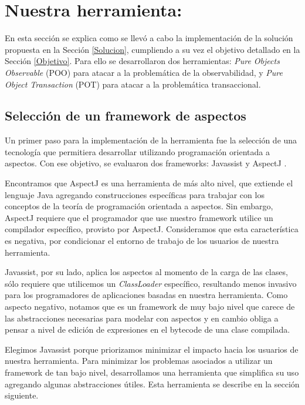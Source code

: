 \section{Nuestra herramienta: }

	En esta sección se explica como se llevó a cabo la implementación de la solución
	propuesta en la Sección \ref{Solucion}, cumpliendo a su vez el objetivo
	detallado en la Sección \ref{Objetivo}. Para ello se desarrollaron dos
	herramientas:
	\emph{Pure Objects Observable} (POO) para atacar a la problemática de la
	observabilidad, y \emph{Pure Object Transaction} (POT) para atacar a la
	problemática transaccional.
		
	\subsection{Selección de un framework de aspectos}  
		Un primer paso para la implementación de la herramienta fue la selección de una
		tecnología que permitiera desarrollar utilizando programación orientada a
		aspectos.
		Con ese objetivo, se evaluaron dos frameworks: Javassist
		\cite{chiba00loadtime} y AspectJ \cite{KiczalesHHKPG01}.
		
		\medskip 
		Encontramos que AspectJ es una herramienta de más alto nivel, que extiende
		el lenguaje Java agregando construcciones específicas para trabajar con
		los conceptos de la teoría de programación orientada a aspectos.
		Sin embargo, AspectJ requiere que el programador que use nuestro framework
		utilice un compilador específico, provisto por AspectJ. 
		Consideramos que esta característica es negativa, por condicionar el
		entorno de trabajo de los usuarios de nuestra herramienta.
		
		Javassist, por su lado, aplica los aspectos al momento de
		la carga de las clases, sólo requiere que utilicemos un \emph{ClassLoader}
		específico, resultando menos invasivo para los programadores de aplicaciones
		basadas en nuestra herramienta.
		Como aspecto negativo, notamos que es un framework de muy bajo nivel que
		carece de las abstracciones necesarias para modelar con aspectos y en cambio
		obliga a pensar a nivel de edición de expresiones en el bytecode de una clase
		compilada.
		
		Elegimos Javassist porque priorizamos minimizar el impacto hacia los usuarios
		de nuestra herramienta.
		Para minimizar los problemas asociados a utilizar un framework de tan bajo
		nivel, desarrollamos una herramienta que simplifica su uso agregando algunas
		abstracciones útiles. Esta herramienta se describe en la sección siguiente.

